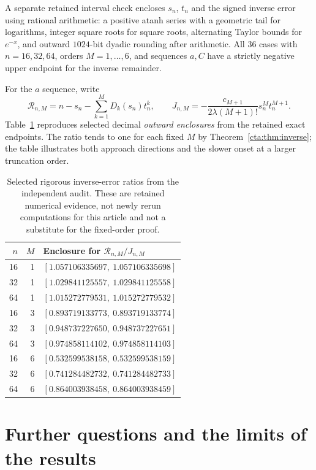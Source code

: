 \documentclass[11pt]{article}
\theoremstyle{definition}
\theoremstyle{remark}
\newcommand{\la}{\lambda}
\newcommand{\Rinv}{\mathcal R}
\begin{document}
A separate retained interval check encloses $s_n$, $t_n$ and the signed
inverse error using rational arithmetic: a positive atanh series with a
geometric tail for logarithms, integer square roots for square roots,
alternating Taylor bounds for $e^{-x}$, and outward $1024$-bit dyadic
rounding after arithmetic. All $36$ cases with $n=16,32,64$, orders
$M=1,\ldots,6$, and sequences $a,C$ have a strictly negative upper
endpoint for the inverse remainder.

For the $a$ sequence, write
\[
 \Rinv_{n,M}=n-s_n-\sum_{k=1}^MD_k(s_n)t_n^k,\qquad
 J_{n,M}=-\frac{c_{M+1}}{2\la(M+1)!}s_n^Mt_n^{M+1}.
\]
Table~\ref{cta:tab:ratios} reproduces selected decimal \emph{outward enclosures}
from the retained exact endpoints. The ratio tends to one for each fixed
$M$ by Theorem~\ref{cta:thm:inverse}; the table illustrates both approach
directions and the slower onset at a larger truncation order.

\begin{table}[htbp]
\centering
\small
\begin{tabular}{r r l}
\toprule
$n$ & $M$ & Enclosure for $\Rinv_{n,M}/J_{n,M}$\\
\midrule
16&1&$[1.057106335697,\ 1.057106335698]$\\
32&1&$[1.029841125557,\ 1.029841125558]$\\
64&1&$[1.015272779531,\ 1.015272779532]$\\[2pt]
16&3&$[0.893719133773,\ 0.893719133774]$\\
32&3&$[0.948737227650,\ 0.948737227651]$\\
64&3&$[0.974858114102,\ 0.974858114103]$\\[2pt]
16&6&$[0.532599538158,\ 0.532599538159]$\\
32&6&$[0.741284482732,\ 0.741284482733]$\\
64&6&$[0.864003938458,\ 0.864003938459]$\\
\bottomrule
\end{tabular}
\caption{Selected rigorous inverse-error ratios from the independent audit.
These are retained numerical evidence, not newly rerun computations for
this article and not a substitute for the fixed-order proof.}
\label{cta:tab:ratios}
\end{table}

\section{Further questions and the limits of the results}\label{cta:sec:questions}
\end{document}
